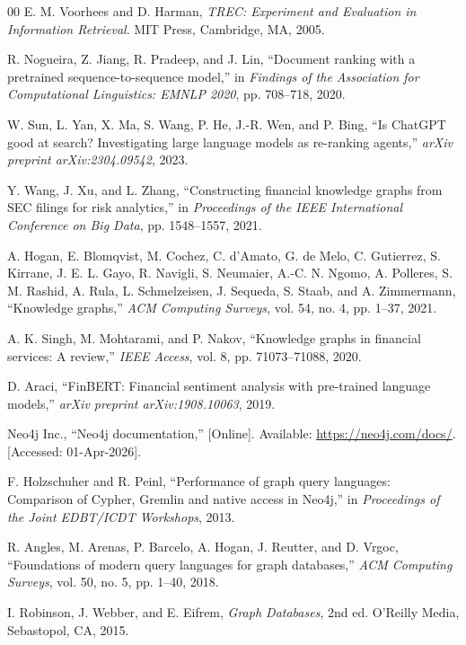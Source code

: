\documentclass[conference]{IEEEtran}
\begin{document}
\begin{thebibliography}{00}
E. M. Voorhees and D. Harman, \textit{TREC: Experiment and Evaluation in Information Retrieval}. MIT Press, Cambridge, MA, 2005.

R. Nogueira, Z. Jiang, R. Pradeep, and J. Lin, ``Document ranking with a pretrained sequence-to-sequence model,'' in \textit{Findings of the Association for Computational Linguistics: EMNLP 2020}, pp. 708--718, 2020.

W. Sun, L. Yan, X. Ma, S. Wang, P. He, J.-R. Wen, and P. Bing, ``Is ChatGPT good at search? Investigating large language models as re-ranking agents,'' \textit{arXiv preprint arXiv:2304.09542}, 2023.

Y. Wang, J. Xu, and L. Zhang, ``Constructing financial knowledge graphs from SEC filings for risk analytics,'' in \textit{Proceedings of the IEEE International Conference on Big Data}, pp. 1548--1557, 2021.

A. Hogan, E. Blomqvist, M. Cochez, C. d'Amato, G. de Melo, C. Gutierrez, S. Kirrane, J. E. L. Gayo, R. Navigli, S. Neumaier, A.-C. N. Ngomo, A. Polleres, S. M. Rashid, A. Rula, L. Schmelzeisen, J. Sequeda, S. Staab, and A. Zimmermann, ``Knowledge graphs,'' \textit{ACM Computing Surveys}, vol. 54, no. 4, pp. 1--37, 2021.

A. K. Singh, M. Mohtarami, and P. Nakov, ``Knowledge graphs in financial services: A review,'' \textit{IEEE Access}, vol. 8, pp. 71073--71088, 2020.

D. Araci, ``FinBERT: Financial sentiment analysis with pre-trained language models,'' \textit{arXiv preprint arXiv:1908.10063}, 2019.

Neo4j Inc., ``Neo4j documentation,'' [Online]. Available: \url{https://neo4j.com/docs/}. [Accessed: 01-Apr-2026].

F. Holzschuher and R. Peinl, ``Performance of graph query languages: Comparison of Cypher, Gremlin and native access in Neo4j,'' in \textit{Proceedings of the Joint EDBT/ICDT Workshops}, 2013.

R. Angles, M. Arenas, P. Barcelo, A. Hogan, J. Reutter, and D. Vrgoc, ``Foundations of modern query languages for graph databases,'' \textit{ACM Computing Surveys}, vol. 50, no. 5, pp. 1--40, 2018.

I. Robinson, J. Webber, and E. Eifrem, \textit{Graph Databases}, 2nd ed. O'Reilly Media, Sebastopol, CA, 2015.


\end{thebibliography}
\end{document}
